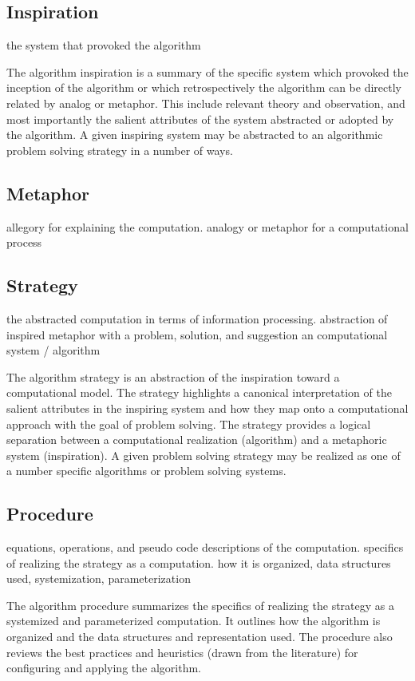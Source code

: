 \documentclass[a4paper, 11pt]{article}
\begin{document}
\subsection{Inspiration}
the system that provoked the algorithm

The algorithm inspiration is a summary of the specific system which provoked the inception of the algorithm or which retrospectively the algorithm can be directly related by analog or metaphor. This include relevant theory and observation, and most importantly the salient attributes of the system abstracted or adopted by the algorithm. A given inspiring system may be abstracted to an algorithmic problem solving strategy in a number of ways.

\subsection{Metaphor}
allegory for explaining the computation. analogy or metaphor for a computational process

\subsection{Strategy}
the abstracted computation in terms of information processing. abstraction of inspired metaphor with a problem, solution, and suggestion an computational system / algorithm

The algorithm strategy is an abstraction of the inspiration toward a computational model. The strategy highlights a canonical interpretation of the salient attributes in the inspiring system and how they map onto a computational approach with the goal of problem solving. The strategy provides a logical separation between a computational realization (algorithm) and a metaphoric system (inspiration). A given problem solving strategy may be realized as one of a number specific algorithms or problem solving systems.

\subsection{Procedure}
equations, operations, and pseudo code descriptions of the computation. specifics of realizing the strategy as a computation. how it is organized, data structures used, systemization, parameterization

The algorithm procedure summarizes the specifics of realizing the strategy as a systemized and parameterized computation. It outlines how the algorithm is organized and the data structures and representation used. The procedure also reviews the best practices and heuristics (drawn from the literature) for configuring and applying the algorithm.
\end{document}
